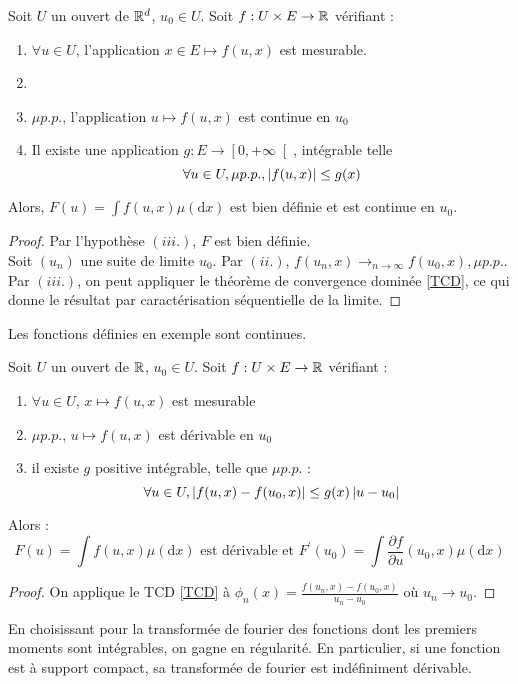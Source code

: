 \documentclass{cours}
\begin{document}
\begin{theorem}
    Soit $U$ un ouvert de $\mathbb{R}^{d}$, $u_0 \in U$. Soit $f : U \times E \to \mathbb{R}$ vérifiant : \begin{enumerate}
        \item $\forall u \in U$, l'application $x \in E \mapsto f(u, x)$ est mesurable.
        \item \item $\mu p.p.$, l'application $u \mapsto f(u, x)$ est continue en $u_{0}$
        \item Il existe une application $g : E \to \left[0, +\infty\right[$, intégrable telle \[\forall u \in U, \mu p.p., \left|f(u, x)\right| \leq g(x)\]

    \end{enumerate}
    Alors, $F(u) = \int f(u, x) \mu(\mathrm{d}x)$ est bien définie et est continue en $u_{0}$.
\end{theorem}
\begin{proof}
    Par l'hypothèse $(iii.)$, $F$ est bien définie.\\
    Soit $(u_{n})$ une suite de limite $u_{0}$. Par $(ii.)$, $f(u_{n}, x) \to_{n\to \infty} f(u_{0}, x), \mu p.p.$. Par $(iii.)$, on peut appliquer le théorème de convergence dominée \ref{TCD}, ce qui donne le résultat par caractérisation séquentielle de la limite.
\end{proof}
\begin{corollary}
    Les fonctions définies en exemple sont continues.
\end{corollary}

\begin{theorem}
    Soit $U$ un ouvert de $\mathbb{R}$, $u_0 \in U$. Soit $f : U \times E \to \mathbb{R}$ vérifiant : \begin{enumerate}
        \item $\forall u \in U$, $x \mapsto f(u, x)$ est mesurable
        \item $\mu p.p.$, $u \mapsto f(u, x)$ est dérivable en $u_{0}$
        \item il existe $g$ positive intégrable, telle que $\mu p.p.$ : \[\forall u \in U, \left|f(u, x) - f(u_{0}, x)\right| \leq g(x)\left|u - u_{0}\right|\]
    \end{enumerate}
    Alors : \[F(u) = \int f(u, x) \mu(\mathrm{d}x) \text{ est dérivable et } F^{'}(u_{0}) = \int \frac{\partial f}{\partial u}(u_{0}, x)\mu(\mathrm{d}x)\]
\end{theorem}
\begin{proof}
    On applique le TCD \ref{TCD} à $\phi_{n}(x) = \frac{f(u_{n}, x) - f(u_{0}, x)}{u_{n} - u_{0}}$ où $u_{n} \to u_{0}$.
\end{proof}
\begin{corollary}
    En choisissant pour la transformée de fourier des fonctions dont les premiers moments sont intégrables, on gagne en régularité. En particulier, si une fonction est à support compact, sa transformée de fourier est indéfiniment dérivable.
\end{corollary}
\end{document}
